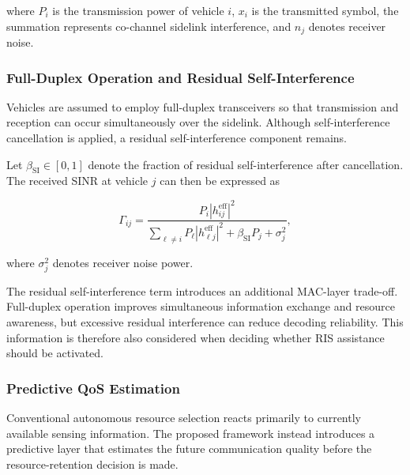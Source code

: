 where $P_i$ is the transmission power of vehicle $i$, $x_i$ is the
transmitted symbol, the summation represents co-channel sidelink
interference, and $n_j$ denotes receiver noise.

\subsubsection{Full-Duplex Operation and Residual Self-Interference}

Vehicles are assumed to employ full-duplex transceivers so that
transmission and reception can occur simultaneously over the sidelink.
Although self-interference cancellation is applied, a residual
self-interference component remains.

Let $\beta_{\mathrm{SI}}\in[0,1]$ denote the fraction of residual
self-interference after cancellation. The received SINR at vehicle
$j$ can then be expressed as

\begin{equation}
\Gamma_{ij}
=
\frac{
P_i
\left|
h_{ij}^{\mathrm{eff}}
\right|^2
}{
\displaystyle
\sum_{\ell\neq i}
P_{\ell}
\left|
h_{\ell j}^{\mathrm{eff}}
\right|^2
+
\beta_{\mathrm{SI}}P_j
+
\sigma_j^2
},
\label{eq:ris_fd_sinr}
\end{equation}

where $\sigma_j^2$ denotes receiver noise power.

The residual self-interference term introduces an additional MAC-layer
trade-off. Full-duplex operation improves simultaneous information
exchange and resource awareness, but excessive residual interference
can reduce decoding reliability. This information is therefore also
considered when deciding whether RIS assistance should be activated.

\subsubsection{Predictive QoS Estimation}

Conventional autonomous resource selection reacts primarily to currently
available sensing information. The proposed framework instead introduces
a predictive layer that estimates the future communication quality before
the resource-retention decision is made.

